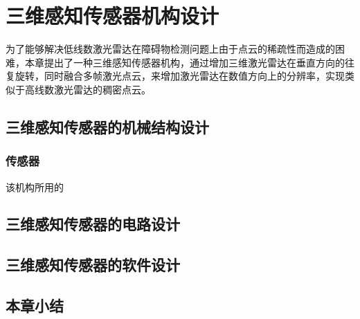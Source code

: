 
\chapter{三维感知传感器机构设计}
为了能够解决低线数激光雷达在障碍物检测问题上由于点云的稀疏性而造成的困难，本章提出了一种三维感知传感器机构，通过增加三维激光雷达在垂直方向的往复旋转，同时融合多帧激光点云，来增加激光雷达在数值方向上的分辨率，实现类似于高线数激光雷达的稠密点云。

\section{三维感知传感器的机械结构设计}

\subsection{传感器}
该机构所用的
\section{三维感知传感器的电路设计}

\section{三维感知传感器的软件设计}

\section{本章小结}
